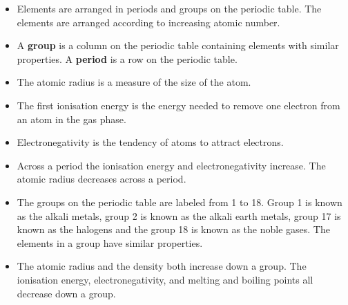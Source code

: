             \label{m38757*uid0123}\begin{itemize}[noitemsep]
\item Elements are arranged in periods and groups on the periodic table. The elements are arranged according to increasing atomic number. 
\item A \textbf{group} is a column on the periodic table containing elements with similar properties. A \textbf{period} is a row on the periodic table.
\item The atomic radius is a measure of the size of the atom.
\item The first ionisation energy is the energy needed to remove one electron from an atom in the gas phase.
\item Electronegativity is the tendency of atoms to attract electrons.
\item Across a period the ionisation energy and electronegativity increase. The atomic radius decreases across a period.
\item The groups on the periodic table are labeled from 1 to 18. Group 1 is known as the alkali metals, group 2 is known as the alkali earth metals, group 17 is known as the halogens and the group 18 is known as the noble gases. The elements in a group have similar properties.
\item The atomic radius and the density both increase down a group. The ionisation energy, electronegativity, and melting and boiling points all decrease down a group.
\end{itemize}
        \label{m38757*eip-219}

